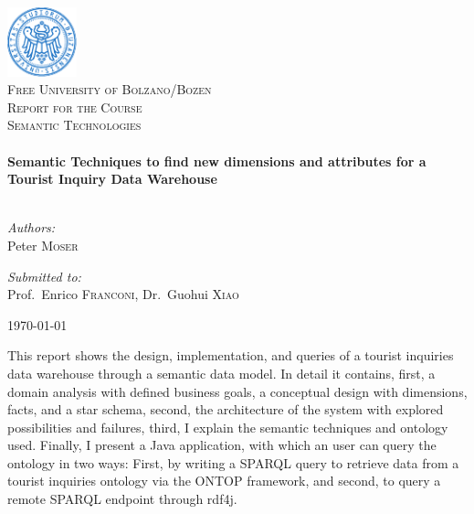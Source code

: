 
\begin{titlepage}
\begin{center}

\includegraphics[width=0.15\textwidth]{img/unibz-logo.pdf}
~\\[1cm]
\textsc{\LARGE Free University of Bolzano/Bozen}
\\[1.5cm]
\textsc{\Large Report for the Course \\ Semantic Technologies}
\\[0.5cm]

\HRule{0.5pt} 
\\[0.4cm]
{ 
	\huge 
	\bfseries 
	Semantic Techniques to find new dimensions and attributes for a Tourist Inquiry Data Warehouse
	\\[0.4cm] 
}
\HRule{2pt} 
\\[1.5cm]

\noindent
\begin{minipage}[t][][b]{0.4\textwidth}
	\begin{flushleft} \large
		\emph{Authors:}\\
		Peter \textsc{Moser}
	\end{flushleft}
\end{minipage}%
\begin{minipage}[t][][b]{0.4\textwidth}
	\begin{flushright} \large
		\emph{Submitted to:} \\
		Prof.~Enrico \textsc{Franconi}, Dr.~Guohui \textsc{Xiao}
	\end{flushright}
\end{minipage}


\vspace{.8cm}

{\large \today}

\vfill

\HRule{0.1pt} 
\begin{flushleft}
This report shows the design, implementation, and queries of a tourist inquiries data warehouse through a semantic data model. In detail it contains, first, a domain analysis with defined business goals, a conceptual design with dimensions, facts, and a star schema, second, the architecture of the system with explored possibilities and failures, third, I explain the semantic techniques and ontology used. Finally, I present a Java application, with which an user can query the ontology in two ways: First, by writing a SPARQL query to retrieve data from a tourist inquiries ontology via the ONTOP framework, and second, to query a remote SPARQL endpoint through rdf4j.  
\end{flushleft}
\HRule{0.1pt}
\end{center}
\end{titlepage}